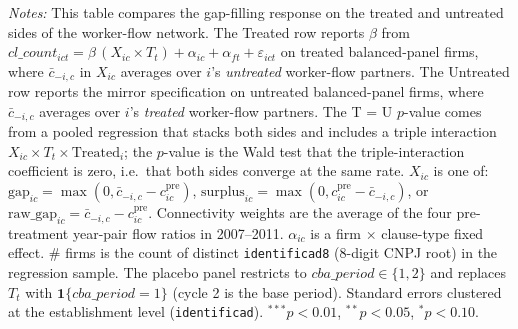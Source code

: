 \begin{table}[H]
\begin{minipage}{\linewidth}
\textit{Notes:} This table compares the gap-filling response on the treated and untreated sides of the worker-flow network. The Treated row reports $\beta$ from $cl\_count_{ict} = \beta\,(X_{ic} \times T_t) + \alpha_{ic} + \alpha_{ft} + \varepsilon_{ict}$ on treated balanced-panel firms, where $\bar c_{-i,c}$ in $X_{ic}$ averages over $i$'s \textit{untreated} worker-flow partners. The Untreated row reports the mirror specification on untreated balanced-panel firms, where $\bar c_{-i,c}$ averages over $i$'s \textit{treated} worker-flow partners. The T = U $p$-value comes from a pooled regression that stacks both sides and includes a triple interaction $X_{ic} \times T_t \times \text{Treated}_i$; the $p$-value is the Wald test that the triple-interaction coefficient is zero, i.e.\ that both sides converge at the same rate. $X_{ic}$ is one of: $\text{gap}_{ic} = \max(0, \bar{c}_{-i,c} - c^{\text{pre}}_{ic})$, $\text{surplus}_{ic} = \max(0, c^{\text{pre}}_{ic} - \bar{c}_{-i,c})$, or $\text{raw\_gap}_{ic} = \bar{c}_{-i,c} - c^{\text{pre}}_{ic}$. Connectivity weights are the average of the four pre-treatment year-pair flow ratios in 2007--2011. $\alpha_{ic}$ is a firm $\times$ clause-type fixed effect. \# firms is the count of distinct \texttt{identificad8} (8-digit CNPJ root) in the regression sample. The placebo panel restricts to $cba\_period \in \{1, 2\}$ and replaces $T_t$ with $\mathbf{1}\{cba\_period = 1\}$ (cycle 2 is the base period). Standard errors clustered at the establishment level (\texttt{identificad}). $^{***}p<0.01$, $^{**}p<0.05$, $^{*}p<0.10$.
\end{minipage}
\end{table}

